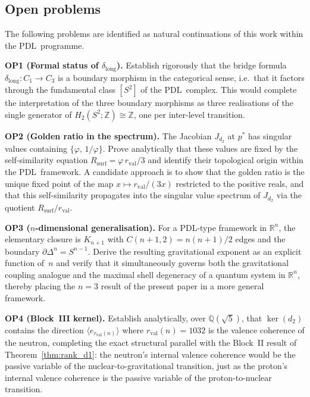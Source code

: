 \documentclass[11pt,a4paper]{article}
\theoremstyle{definition}
\newcommand{\PDL}{\textnormal{PDL}}
\newcommand{\Rsurf}{R_{\mathrm{surf}}}
\newcommand{\rval}{r_{\mathrm{val}}}
\newcommand{\dmap}[1]{d_{#1}}
\newcommand{\dlong}{\delta_{\mathrm{long}}}
\newcommand{\vp}{\varphi}
\begin{document}
\subsection{Open problems}
\label{subsec:open}

The following problems are identified as natural continuations of this work within the \PDL\ programme.

\medskip\noindent\textbf{OP1 (Formal status of $\dlong$).} Establish rigorously that the bridge formula $\dlong : C_1 \to C_3$ is a boundary morphism in the categorical sense, i.e.\ that it factors through the fundamental class $[S^2]$ of the \PDL\ complex. This would complete the interpretation of the three boundary morphisms as three realisations of the single generator of $H_2(S^2;\mathbb{Z}) \cong \mathbb{Z}$, one per inter-level transition.

\medskip\noindent\textbf{OP2 (Golden ratio in the spectrum).} The Jacobian $J_{\dmap{2}}$ at $p^*$ has singular values containing $\{\vp,\, 1/\vp\}$. Prove analytically that these values are fixed by the self-similarity equation $\Rsurf = \vp\,\rval/3$ and identify their topological origin within the \PDL\ framework. A candidate approach is to show that the golden ratio is the unique fixed point of the map $x \mapsto \rval/(3x)$ restricted to the positive reals, and that this self-similarity propagates into the singular value spectrum of $J_{\dmap{2}}$ via the quotient $\Rsurf/\rval$.

\medskip\noindent\textbf{OP3 ($n$-dimensional generalisation).} For a \PDL-type framework in $\mathbb{R}^n$, the elementary closure is $K_{n+1}$ with $C(n+1,2) = n(n+1)/2$ edges and the boundary $\partial\Delta^n = S^{n-1}$. Derive the resulting gravitational exponent as an explicit function of~$n$ and verify that it simultaneously governs both the gravitational coupling analogue and the maximal shell degeneracy of a quantum system in $\mathbb{R}^n$, thereby placing the $n=3$ result of the present paper in a more general framework.

\medskip\noindent\textbf{OP4 (Block~III kernel).} Establish analytically, over $\mathbb{Q}(\sqrt{5})$, that $\ker(\dmap{2})$ contains the direction $\langle e_{\rval(n)}\rangle$ where $\rval(n) = 1032$ is the valence coherence of the neutron, completing the exact structural parallel with the Block~II result of Theorem~\ref{thm:rank_d1}: the neutron's internal valence coherence would be the passive variable of the nuclear-to-gravitational transition, just as the proton's internal valence coherence is the passive variable of the proton-to-nuclear transition.
\end{document}
